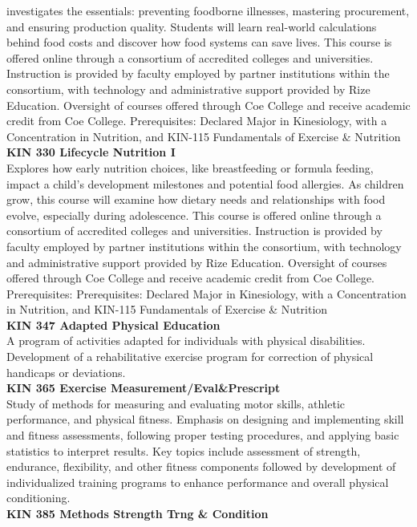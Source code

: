 \documentclass[
  letterpaper,
]{scrbook}
\begin{document}
investigates the essentials: preventing foodborne illnesses, mastering
procurement, and ensuring production quality. Students will learn
real-world calculations behind food costs and discover how food systems
can save lives. This course is offered online through a consortium of
accredited colleges and universities. Instruction is provided by faculty
employed by partner institutions within the consortium, with technology
and administrative support provided by Rize Education. Oversight of
courses offered through Coe College and receive academic credit from Coe
College. Prerequisites: Declared Major in Kinesiology, with a
Concentration in Nutrition, and KIN-115 Fundamentals of Exercise \&
Nutrition\\
\textbf{KIN 330 Lifecycle Nutrition I}\\
Explores how early nutrition choices, like breastfeeding or formula
feeding, impact a child's development milestones and potential food
allergies. As children grow, this course will examine how dietary needs
and relationships with food evolve, especially during adolescence. This
course is offered online through a consortium of accredited colleges and
universities. Instruction is provided by faculty employed by partner
institutions within the consortium, with technology and administrative
support provided by Rize Education. Oversight of courses offered through
Coe College and receive academic credit from Coe College. Prerequisites:
Prerequisites: Declared Major in Kinesiology, with a Concentration in
Nutrition, and KIN-115 Fundamentals of Exercise \& Nutrition\\
\textbf{KIN 347 Adapted Physical Education}\\
A program of activities adapted for individuals with physical
disabilities. Development of a rehabilitative exercise program for
correction of physical handicaps or deviations.\\
\textbf{KIN 365 Exercise Measurement/Eval\&Prescript}\\
Study of methods for measuring and evaluating motor skills, athletic
performance, and physical fitness. Emphasis on designing and
implementing skill and fitness assessments, following proper testing
procedures, and applying basic statistics to interpret results. Key
topics include assessment of strength, endurance, flexibility, and other
fitness components followed by development of individualized training
programs to enhance performance and overall physical conditioning.\\
\textbf{KIN 385 Methods Strength Trng \& Condition}\\
\end{document}
